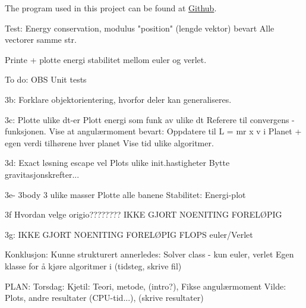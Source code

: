 


The program used in this project can be found at \href{https://github.com/kjetka/Project3}{Github}. 




Test: 		Energy conservation, modulus "position" (lengde vektor) bevart
				Alle vectorer samme str.



	Printe + plotte energi stabilitet mellom euler og verlet.


To do:
	OBS Unit tests
	
	3b:
								Forklare objektorientering, hvorfor deler kan generaliseres. 
	
	3c: 					  Plotte ulike dt-er
								Plott energi som funk av ulike dt
								Referere til convergens - funksjonen.
								Vise at angulærmoment bevart:
										Oppdatere til L = mr x v i Planet + egen verdi tilhørene hver planet
								Vise tid ulike algoritmer. 

	3d: 					  Exact løsning escape vel
								Plots ulike init.hastigheter
								Bytte gravitasjonskrefter... 
								
	3e- 3body			3 ulike masser
								Plotte alle banene
								Stabilitet: Energi-plot
	
	3f							Hvordan velge origio????????
								IKKE GJORT NOENITING FORELØPIG
	
	3g:							IKKE GJORT NOENITING FORELØPIG					
	FLOPS euler/Verlet
		

Konklusjon: 
	Kunne strukturert annerledes: 
		Solver class  - kun euler, verlet
		Egen klasse for å kjøre algoritmer i (tidsteg, skrive fil)
		
		
		
PLAN: 
Torsdag:
	Kjetil: Teori, metode, (intro?), Fikse angulærmoment
	Vilde: Plots, andre resultater (CPU-tid...),  (skrive resultater)